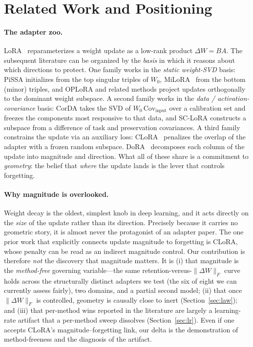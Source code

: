 \documentclass[11pt]{article}
\newcommand{\dw}{\lVert\Delta W\rVert_F}
\begin{document}
\section{Related Work and Positioning}\label{sec:related}
\paragraph{The adapter zoo.} LoRA~\citep{hu2021lora} reparameterizes a weight update as
a low-rank product $\Delta W = BA$. The subsequent literature can be organized by the
\emph{basis} in which it reasons about which directions to protect. One family works in
the \emph{static weight-SVD} basis: PiSSA initializes from the top singular triples of
$W_0$, MiLoRA~\citep{wang2024milora} from the bottom (minor) triples, and OPLoRA and
related methods project updates orthogonally to the dominant weight subspace.
A second family works in the \emph{data / activation-covariance} basis: CorDA
\citep{yang2024corda} takes the SVD of $W_0\,\mathrm{Cov}_{\text{input}}$ over a
calibration set and freezes the components most responsive to that data, and SC-LoRA
constructs a subspace from a difference of task and preservation covariances. A third
family constrains the update via an auxiliary loss: CLoRA~\citep{clora} penalizes the
overlap of the adapter with a frozen random subspace. DoRA~\citep{liu2024dora}
decomposes each column of the update into magnitude and direction. What all of these
share is a commitment to \emph{geometry}: the belief that \emph{where} the update lands
is the lever that controls forgetting.

\paragraph{Why magnitude is overlooked.} Weight decay is the oldest, simplest knob in
deep learning, and it acts directly on the \emph{size} of the update rather than its
direction. Precisely because it carries no geometric story, it is almost never the
protagonist of an adapter paper. The one prior work that explicitly connects update
magnitude to forgetting is CLoRA, whose penalty can be read as an indirect magnitude
control. Our contribution is therefore \emph{not} the discovery that magnitude matters.
It is (i) that magnitude is the \emph{method-free} governing variable---the same
retention-versus-$\dw$ curve holds across the structurally distinct adapters we test
(the six of eight we can currently assess fairly), two domains, and a partial second
model; (ii) that once $\dw$ is controlled, geometry
is causally close to inert (Section~\ref{sec:law}); and (iii) that per-method wins
reported in the literature are largely a learning-rate artifact that a per-method sweep
dissolves (Section~\ref{sec:lr}). Even if one accepts CLoRA's magnitude--forgetting
link, our delta is the demonstration of method-freeness and the diagnosis of the
artifact.
\end{document}
